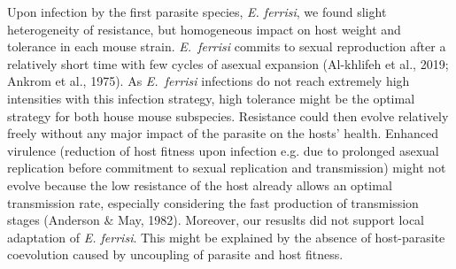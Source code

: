 \documentclass[12pt]{article}
\renewcommand{\_}{\kern-1.5pt\textunderscore\kern-1.5pt}
\begin{document}
Upon infection by the first parasite species, \textit{E. ferrisi}, we found slight heterogeneity of resistance, but homogeneous impact on host weight and tolerance in each mouse strain. \textit{E. ferrisi} commits to sexual reproduction after a relatively short time with few cycles of asexual expansion (Al-khlifeh et al., 2019; Ankrom et al., 1975). As \textit{E. ferrisi }infections do not reach extremely high intensities with this infection strategy, high tolerance might be the optimal strategy for both house mouse subspecies. Resistance could then evolve relatively freely without any major impact of the parasite on the hosts’ health. Enhanced virulence (reduction of host fitness upon infection e.g. due to prolonged asexual replication before commitment to sexual replication and transmission) might not evolve because the low resistance of the host already allows an optimal transmission rate, especially considering the fast production of transmission stages (Anderson $\&$  May, 1982). \textcolor[HTML]{FF0000}{Moreover, our resuslts did not support loc}al adaptation of \textit{E. ferrisi}. This might be explained by the absence of host-parasite coevolution caused by uncoupling of parasite and host fitness.\par
\end{document}
